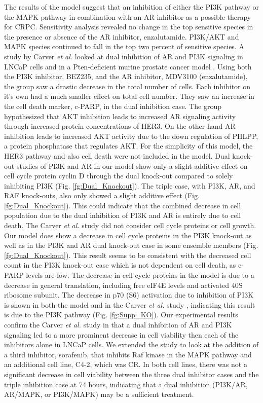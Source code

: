 \documentclass[12pt]{article}
\begin{document}
The results of the model suggest that an inhibition of either the PI3K pathway or the MAPK pathway in combination with an AR inhibitor as a possible therapy for CRPC. 
Sensitivity analysis revealed no change in the top sensitive species in the presence or absence of the AR inhibitor, enzalutamide. 
PI3K/AKT and MAPK species continued to fall in the top two percent of sensitive species. 
A study by Carver \textit{et al.} looked at dual inhibition of AR and PI3K signaling in LNCaP cells and in a Pten-deficient murine prostate cancer model \cite{Parker2013}. 
Using both the PI3K inhibitor, BEZ235, and the AR inhibitor, MDV3100 (enzalutamide), the group saw a drastic decrease in the total number of cells. 
Each inhibitor on it’s own had a much smaller effect on total cell number. They saw an increase in the cell death marker, c-PARP, in the dual inhibition case. 
The group hypothesized that AKT inhibition leads to increased AR signaling activity through increased protein concentrations of HER3. 
On the other hand AR inhibition leads to increased AKT activity due to the down regulation of PHLPP, a protein phosphatase that regulates AKT. 
For the simplicity of this model, the HER3 pathway and also cell death were not included in the model. 
Dual knock-out studies of PI3K and AR in our model show only a slight additive effect on cell cycle protein cyclin D through the dual knock-out compared to solely inhibiting PI3K (Fig. \ref{fg:Dual_Knockout}).
The triple case, with PI3K, AR, and RAF knock-outs, also only showed a slight additive effect (Fig. \ref{fg:Dual_Knockout}).
This could indicate that the combined decrease in cell population due to the dual inhibition of PI3K and AR is entirely due to cell death. 
The Carver \textit{et al.} study did not consider cell cycle proteins or cell growth. 
Our model does show a decrease in cell cycle proteins in the PI3K knock-out as well as in the PI3K and AR dual knock-out case in some ensemble members (Fig. \ref{fg:Dual_Knockout}). 
This result seems to be consistent with the decreased cell count in the PI3K knock-out case which is not dependent on cell death, as c-PARP levels are low. 
The decrease in cell cycle proteins in the model is due to a decrease in general translation, including free eIF4E levels and activated 40S ribosome subunit. 
The decrease in p70 (S6) activation due to inhibition of PI3K is shown in both the model and in the Carver \textit{et al.} study , indicating this result is due to the PI3K pathway (Fig. \ref{fg:Supp_KO}). 
Our experimental results confirm the Carver \textit{et al.} study in that a dual inhibition of AR and PI3K signaling led to a more prominent decrease in cell viability then each of the inhibitors alone in LNCaP cells. 
We extended the study to look at the addition of a third inhibitor, sorafenib, that inhibits Raf kinase in the MAPK pathway and an additional cell line, C4-2, which was CR.  In both cell lines, there was not a significant decrease in cell viability between the three dual inhibitor cases and the triple inhibition case at 74 hours, indicating that a dual inhibition (PI3K/AR, AR/MAPK, or PI3K/MAPK) may be a sufficient treatment. 
\end{document}
